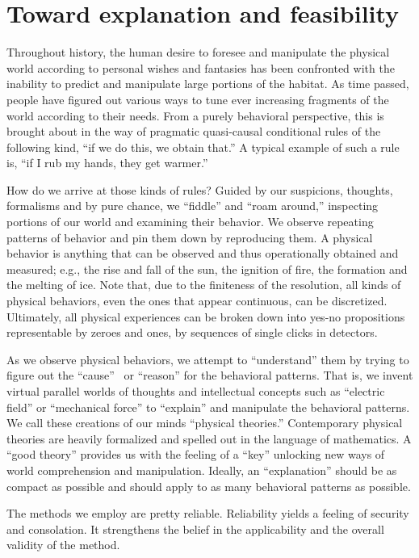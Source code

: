 \documentclass[rmp,amsfonts,showpacs,showkeys,twocolumn]{revtex4}
\begin{document}
\section{Toward explanation and feasibility}

Throughout history,
the human desire to foresee and manipulate the physical world according to personal wishes and  fantasies
has been confronted with the inability to predict and manipulate
large portions of the habitat.
As time passed, people have figured out various ways to tune
ever increasing fragments of the world according to their needs.
From a purely behavioral perspective, this is brought about in the way of
pragmatic quasi-causal conditional rules of the following kind,
``if we do this, we obtain that.''
A typical example of such a rule is, ``if I rub my hands, they get warmer.''


How do we arrive at those kinds of rules?
Guided by our suspicions, thoughts, formalisms and by pure chance,
we ``fiddle'' and ``roam around,'' inspecting portions of our world
and examining their behavior.
We observe repeating patterns of behavior and pin them down by reproducing them.
A physical behavior is anything that can be observed and thus operationally obtained and measured;
e.g.,
the rise and fall of the sun, the ignition of fire, the formation and the melting of ice.
Note that, due to the finiteness of the resolution, all kinds of physical behaviors,
even the ones that appear continuous, can be discretized.
Ultimately, all physical experiences can be broken down into yes-no propositions
representable by zeroes and ones, by sequences of single clicks in detectors.


As we observe physical behaviors,
we attempt to ``understand'' them by trying to figure out
the ``cause''~\cite{frank} or ``reason'' for the behavioral  patterns.
That is, we invent virtual parallel worlds of thoughts
and intellectual concepts such as ``electric field'' or ``mechanical force''
to ``explain''  and manipulate the behavioral patterns.
We call these creations of our minds ``physical theories.''
Contemporary physical theories are heavily formalized and spelled out in the language of mathematics.
A ``good theory'' provides us with the feeling of a ``key'' unlocking new ways of world comprehension and manipulation.
Ideally, an ``explanation'' should be as compact as possible
and should apply to as many behavioral patterns as possible.

The methods we employ are pretty reliable.
Reliability yields a feeling of security and consolation.
It strengthens the belief in the applicability and the overall validity of the method.
\end{document}
